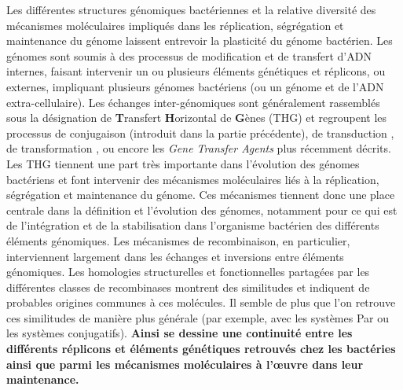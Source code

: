 	Les différentes structures génomiques bactériennes et la relative diversité des mécanismes moléculaires impliqués dans les réplication, ségrégation et maintenance du génome laissent entrevoir la plasticité du génome bactérien. Les génomes sont soumis à des processus de modification et de transfert d'ADN internes, faisant intervenir un ou plusieurs éléments génétiques et réplicons, ou externes, impliquant plusieurs génomes bactériens (ou un génome et de l'ADN extra-cellulaire). Les échanges inter-génomiques sont généralement rassemblés sous la désignation de \textbf{T}ransfert \textbf{H}orizontal de \textbf{G}ènes (THG) et regroupent les processus de conjugaison (introduit dans la partie précédente), de transduction \citep{miller2004bacteriophage}, de transformation \citep{miller2004microbial}, ou encore les \textit{Gene Transfer Agents} plus récemment décrits. Les THG tiennent une part très importante dans l'évolution des génomes bactériens \citep{Wiedenbeck2011} et font intervenir des mécanismes moléculaires liés à la réplication, ségrégation et maintenance du génome. Ces mécanismes tiennent donc une place centrale dans la définition et l'évolution des génomes, notamment pour ce qui est de l'intégration et de la stabilisation dans l'organisme bactérien des différents éléments génomiques. Les mécanismes de recombinaison, en particulier, interviennent largement dans les échanges et inversions entre éléments génomiques. Les homologies structurelles et fonctionnelles partagées par les différentes classes de recombinases montrent des similitudes et indiquent de probables origines communes à ces molécules. Il semble de plus que l'on retrouve ces similitudes de manière plus générale (par exemple, avec les systèmes Par ou les systèmes conjugatifs). \textbf{Ainsi se dessine une continuité entre les différents réplicons et éléments génétiques retrouvés chez les bactéries ainsi que parmi les mécanismes moléculaires à l'œuvre dans leur maintenance.}	
 

 
